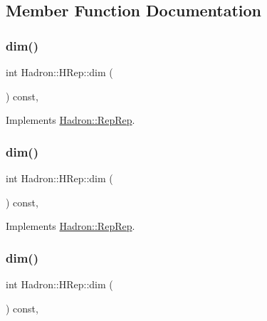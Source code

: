 \subsection{Member Function Documentation}
\mbox{\label{structHadron_1_1HRep_a7ed087e9f4edb84e1c537c6c39680b85}} 
\subsubsection{\texorpdfstring{dim()}{dim()}\hspace{0.1cm}{\footnotesize\ttfamily [1/5]}}
{\footnotesize\ttfamily int Hadron\+::\+H\+Rep\+::dim (\begin{DoxyParamCaption}{ }\end{DoxyParamCaption}) const\hspace{0.3cm}{\ttfamily [inline]}, {\ttfamily [virtual]}}



Implements \mbox{\hyperlink{structHadron_1_1RepRep_a92c8802e5ed7afd7da43ccfd5b7cd92b}{Hadron\+::\+Rep\+Rep}}.

\mbox{\label{structHadron_1_1HRep_a7ed087e9f4edb84e1c537c6c39680b85}} 
\subsubsection{\texorpdfstring{dim()}{dim()}\hspace{0.1cm}{\footnotesize\ttfamily [2/5]}}
{\footnotesize\ttfamily int Hadron\+::\+H\+Rep\+::dim (\begin{DoxyParamCaption}{ }\end{DoxyParamCaption}) const\hspace{0.3cm}{\ttfamily [inline]}, {\ttfamily [virtual]}}



Implements \mbox{\hyperlink{structHadron_1_1RepRep_a92c8802e5ed7afd7da43ccfd5b7cd92b}{Hadron\+::\+Rep\+Rep}}.

\mbox{\label{structHadron_1_1HRep_a7ed087e9f4edb84e1c537c6c39680b85}} 
\subsubsection{\texorpdfstring{dim()}{dim()}\hspace{0.1cm}{\footnotesize\ttfamily [3/5]}}
{\footnotesize\ttfamily int Hadron\+::\+H\+Rep\+::dim (\begin{DoxyParamCaption}{ }\end{DoxyParamCaption}) const\hspace{0.3cm}{\ttfamily [inline]}, {\ttfamily [virtual]}}



